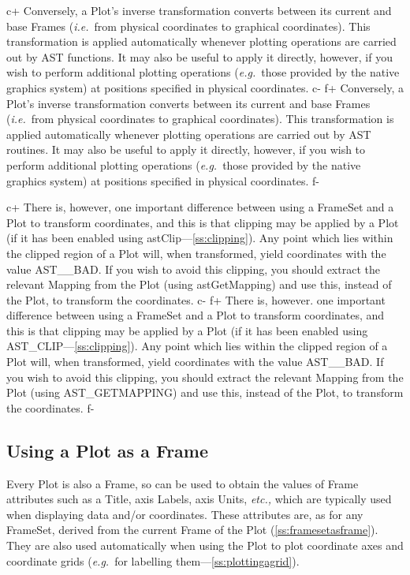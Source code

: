 \documentclass[twoside,11pt]{article}
\newcommand{\secref}[1]{\S\ref{#1}}
\renewcommand{\secref}[1]{\ref{#1}}
\begin{document}
c+
Conversely, a Plot's inverse transformation converts between its
current and base Frames ({\em{i.e.}}\ from physical coordinates to
graphical coordinates). This transformation is applied automatically
whenever plotting operations are carried out by AST functions. It may
also be useful to apply it directly, however, if you wish to perform
additional plotting operations ({\em{e.g.}}\ those provided by the
native graphics system) at positions specified in physical
coordinates.
c-
f+
Conversely, a Plot's inverse transformation converts between its
current and base Frames ({\em{i.e.}}\ from physical coordinates to
graphical coordinates). This transformation is applied automatically
whenever plotting operations are carried out by AST routines. It may
also be useful to apply it directly, however, if you wish to perform
additional plotting operations ({\em{e.g.}}\ those provided by the
native graphics system) at positions specified in physical
coordinates.
f-

c+
There is, however, one important difference between using a FrameSet
and a Plot to transform coordinates, and this is that clipping may be
applied by a Plot (if it has been enabled using
astClip---\secref{ss:clipping}). Any point which lies within the
clipped region of a Plot will, when transformed, yield coordinates
with the value AST\_\_BAD. If you wish to avoid this clipping, you
should extract the relevant Mapping from the Plot (using
astGetMapping) and use this, instead of the Plot, to transform the
coordinates.
c-
f+
There is, however. one important difference between using a FrameSet
and a Plot to transform coordinates, and this is that clipping may be
applied by a Plot (if it has been enabled using
AST\_CLIP---\secref{ss:clipping}). Any point which lies within the
clipped region of a Plot will, when transformed, yield coordinates
with the value AST\_\_BAD. If you wish to avoid this clipping, you
should extract the relevant Mapping from the Plot (using
AST\_GETMAPPING) and use this, instead of the Plot, to transform the
coordinates.
f-

\subsection{Using a Plot as a Frame}

Every Plot is also a Frame, so can be used to obtain the values of
Frame attributes such as a Title, axis Labels, axis Units,
{\em{etc.,}} which are typically used when displaying data and/or
coordinates. These attributes are, as for any FrameSet, derived from
the current Frame of the Plot (\secref{ss:framesetasframe}). They are
also used automatically when using the Plot to plot coordinate axes
and coordinate grids ({\em{e.g.}}\ for labelling
them---\secref{ss:plottingagrid}).
\end{document}
